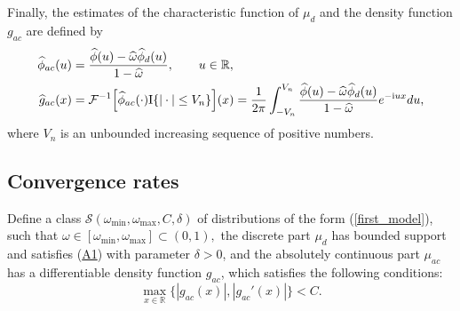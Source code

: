 \documentclass[numbers,webpdf,imaiai]{ima-authoring-template}%
\theoremstyle{thmstyletwo}%
\newcommand{\R}{\mathbb{R}}
\newcommand{\F}{\mathcal{F}}
\newcommand{\I}{{\mathrm{I}}}
\renewcommand{\i}{\mathrm{i}}
\newcommand{\w}{\omega}
\newcommand{\eps}{\varepsilon}
\numberwithin{equation}{section}
\begin{document}
Finally, the estimates of the characteristic function of \(\mu_d\) and the density function \(g_{ac}\) are defined by \begin{align}\label{gac0}
\widehat{\phi}_{ac}(u) &=\frac{\widehat{\phi}(u)  - \widehat{\w} \widehat{\phi}_d(u)}{1-\widehat{\w}}, \qquad u \in \R,\\
\label{gac}
\widehat{g}_{ac}(x) &= \F^{-1} \Bigl[ \widehat{\phi}_{ac}(\cdot)\I\{|\cdot| \leq V_n\} \Bigr](x)
= \frac{1}{2\pi} \int_{-V_n}^{V_n}\frac{\widehat{\phi}(u)  - \widehat{\w} \widehat{\phi}_d(u)}{1-\widehat{\w}} e^{-\i u x}  du, 
\end{align}
where %
\(V_n\) is an unbounded increasing sequence of positive numbers.


\subsection{Convergence rates}
Define a class $\mathcal{S}(\w_{\min}, \w_{\max}, C, \delta)$ of distributions of the form  (\ref{first_model}), such that \(\w \in [\w_{\min}, \w_{\max}] \subset (0,1),\) the discrete part $\mu_d$ has bounded support and satisfies  (\hyperref[cond_A1]{A1}) with parameter \(\delta>0\), and the absolutely continuous part \(\mu_{ac}\) has a differentiable density function \(g_{ac}\), which satisfies the following conditions:
\begin{equation*}
  \max_{x \in \R}\bigl\{
| g_{ac}(x)|, | g_{ac}'(x)|\bigr\} < C. %
\end{equation*}
\end{document}
